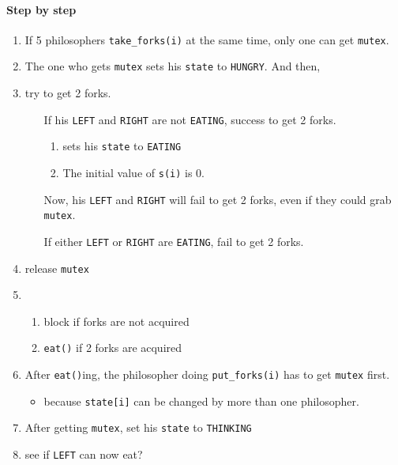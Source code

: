 \paragraph{Step by step}

\begin{enumerate}
\item If 5 philosophers \texttt{take\_forks(i)} at the same time, only one can get \texttt{mutex}.
\item The one who gets \texttt{mutex} sets his \texttt{state} to \texttt{HUNGRY}. And then,
\item {} try to get 2 forks.
  \begin{enumerate}
  \item[If] his \texttt{LEFT} and \texttt{RIGHT} are not \texttt{EATING}, success to get 2 forks.
    \begin{enumerate}
    \item sets his \texttt{state} to \texttt{EATING}
    \item {} The initial value of \texttt{s(i)} is 0.
    \end{enumerate}
    Now, his \texttt{LEFT} and \texttt{RIGHT} will fail to get 2 forks, even if
    they could grab \texttt{mutex}.
  \item [If] either \texttt{LEFT} or \texttt{RIGHT} are \texttt{EATING}, fail to get 2 forks.
  \end{enumerate}
\item release \texttt{mutex}
\item {}
  \begin{enumerate}
  \item block if forks are not acquired
  \item \texttt{eat()} if 2 forks are acquired
  \end{enumerate}
\item After \texttt{eat()}ing, the philosopher doing \texttt{put\_forks(i)} has to get
  \texttt{mutex} first.
  \begin{itemize}
  \item because \texttt{state[i]} can be changed by more than one philosopher.
  \end{itemize}
\item After getting \texttt{mutex}, set his \texttt{state} to \texttt{THINKING}
\item {} see if \texttt{LEFT} can now eat?
  \begin{enumerate}

\end{enumerate}
\end{enumerate}
